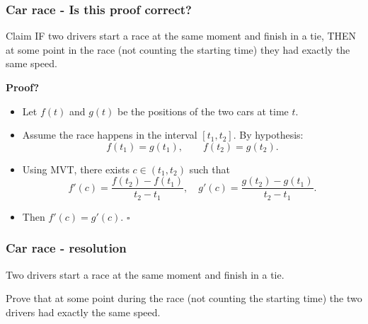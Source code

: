 \documentclass[14pt]{beamer}
\begin{document}
\begin{frame}[t]
	\fontsize{13}{13}\selectfont
	\frametitle{Car race - Is this proof correct?}

	\begin{block}{\fontsize{13}{13}\selectfont Claim}
		IF two drivers start a race at the same moment and finish in a tie, THEN at
		some point in the race (not counting the starting time) they had exactly the
		same speed.
	\end{block}

	{\bfseries Proof?}
	\begin{itemize}
		\item Let $f(t)$ and $g(t)$ be the positions of the two cars at time $t$.

		\item Assume the race happens in the interval $[t_{1},t_{2}]$. By hypothesis:
			\[
				f(t_{1}) = g(t_{1}), \quad \quad f(t_{2}) = g(t_{2}).
			\]

		\item Using MVT, there exists $c \in (t_{1}, t_{2})$ such that
			\[
				f'(c) = \frac{f(t_{2}) - f(t_{1})}{t_{2}- t_{1}}, \quad g'(c) = \frac{g(t_{2})
				- g(t_{1})}{t_{2}- t_{1}}.
			\]

		\item Then $f'(c) = g'(c)$. \hfill $\square$
	\end{itemize}
\end{frame}

\begin{frame}[t]
	\fontsize{13}{13}\selectfont
	\frametitle{Car race - resolution}

	Two drivers start a race at the same moment and finish in a tie.

	Prove that at some point during the race (not counting the starting time) the two
	drivers had exactly the same speed.
\end{frame}
\end{document}
